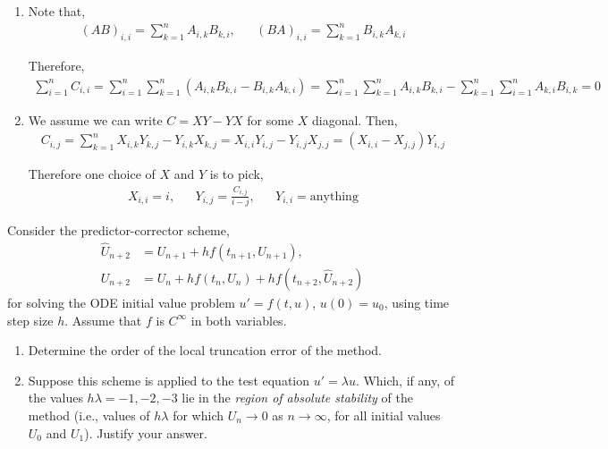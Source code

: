 \documentclass[10pt]{article}
\begin{document}
\begin{solution}[Solution]
\begin{enumerate}[label=(\alph*)]
    \item Note that,
        \begin{align*}
            (AB)_{i,i} = \sum_{k=1}^{n} A_{i,k}B_{k,i}
            ,&&
            (BA)_{i,i} = \sum_{k=1}^{n} B_{i,k}A_{k,i}
        \end{align*}
        
        Therefore,
        \begin{align*}
            \sum_{i=1}^{n} C_{i,i} 
            = \sum_{i=1}^{n} \sum_{k=1}^{n} (A_{i,k}B_{k,i} - B_{i,k}A_{k,i})
            = \sum_{i=1}^{n} \sum_{k=1}^{n} A_{i,k}B_{k,i}
            - \sum_{k=1}^{n} \sum_{i=1}^{n} A_{k,i}B_{i,k}
            = 0
        \end{align*}
        
    \item We assume we can write \( C = XY - YX \) for some \( X \) diagonal. Then,
        \begin{align*}
            C_{i,j} = \sum_{k=1}^{n}X_{i,k}Y_{k,j} - Y_{i,k}X_{k,j}
            = X_{i,i} Y_{i,j} - Y_{i,j}X_{j,j}
            = (X_{i,i} - X_{j,j}) Y_{i,j}
        \end{align*}
       
        Therefore  one choice of \( X \) and \( Y \) is to pick,
        \begin{align*}
            X_{i,i} = i
            ,&&
            Y_{i,j} = \frac{C_{i,j}}{i-j}
            ,&&
            Y_{i,i} = \text{anything}
        \end{align*}

\end{enumerate}
\end{solution}

\begin{problem}
Consider the predictor-corrector scheme,
\begin{align*}
    \hat{U}_{n+2} &= U_{n+1} + hf(t_{n+1},U_{n+1}), \\
    U_{n+2} &= U_n + h f(t_n,U_n) + h f(t_{n+2},\hat{U}_{n+2})
\end{align*}
    for solving the ODE initial value problem \( u' = f(t,u) \), \( u(0) = u_0 \), using time step size \( h \). Assume that \( f \) is \( C^\infty \) in both variables.
    \begin{enumerate}[label=(\alph*),nolistsep]
        \item Determine the order of the local truncation error of the method.
        \item Suppose this scheme is applied to the test equation \( u' = \lambda u \). Which, if any, of the values \( h \lambda = -1,-2,-3 \) lie in the \textit{region of absolute stability} of the method (i.e., values of \( h \lambda \) for which \( U_n \to 0 \) as \( n\to\infty \), for all initial values \( U_0 \) and \( U_1 \)). Justify your answer. 
    \end{enumerate}
\end{problem}
\end{document}
